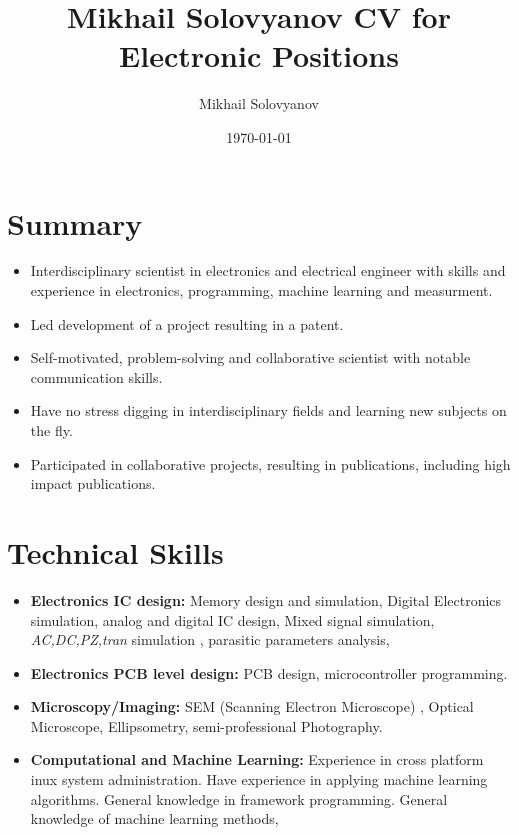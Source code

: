 \documentclass{article}
\title{ Mikhail Solovyanov CV for Electronic Positions}
\author{Mikhail Solovyanov}
\date{\today}
\begin{document}

\makecvtitle %

\section{Summary}
\begin{itemize}
\item Interdisciplinary scientist in electronics and electrical engineer  with skills and experience in electronics, programming, machine learning and measurment.

\item Led development of a  project resulting in a patent.
\item Self-motivated, problem-solving and collaborative scientist with notable communication skills.
\item Have no stress digging in interdisciplinary fields and learning new subjects on the fly.
\item Participated in collaborative projects, resulting in publications, including high impact publications.
\end{itemize}

\section{Technical Skills}

\begin{itemize}
\item \textbf{Electronics IC design:} Memory design and simulation, Digital Electronics simulation, analog and digital IC design, Mixed signal simulation, \textit{AC,DC,PZ,tran} simulation , parasitic parameters analysis,
\item \textbf{Electronics PCB level design:} PCB design, microcontroller programming.
\item \textbf{Microscopy/Imaging:} SEM (Scanning Electron Microscope) , Optical Microscope, Ellipsometry, semi-professional Photography.
\item \textbf{Computational and Machine Learning:} Experience in cross platform inux system administration. Have experience in applying machine learning algorithms. General knowledge in framework programming. General knowledge of machine learning methods,
\end{itemize}
\end{document}
